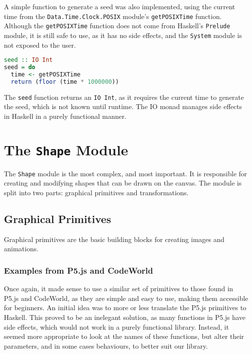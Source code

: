 \documentclass[../main.tex]{subfiles}
\begin{document}
            A simple function to generate a seed was also implemented, using the current
                time from the \texttt{Data.Time.Clock.POSIX} module's \texttt{getPOSIXTime}
                function.
            Although the \texttt{getPOSIXTime} function does not come from Haskell's
                \texttt{Prelude} module, it is still safe to use, as it has no side effects,
                and the \texttt{System} module is not exposed to the user.

            \begin{lstlisting}[language={Haskell}, label={lst:seed}, caption={The \texttt{seed} 
                function.}]
seed :: IO Int
seed = do
  time <- getPOSIXTime
  return (floor (time * 1000000))\end{lstlisting}

            The \texttt{seed} function returns an \texttt{IO Int}, as it requires the
                current time to generate the seed, which is not known until runtime.
            The IO monad manages side effects in Haskell in a purely functional manner.

    \section{The \texttt{Shape}
        Module} The \texttt{Shape} module is the most complex, and most important.
        It is responsible for creating and modifying shapes that can be drawn on the
            canvas.
        The module is split into two parts: graphical primitives and transformations.

        \subsection{Graphical Primitives}
            Graphical primitives are the basic building blocks for creating images and
                animations.

            \subsubsection{Examples from P5.js and CodeWorld}
                Once again, it made sense to use a similar set of primitives to those found in
                    P5.js and CodeWorld, as they are simple and easy to use, making them accessible
                    for beginners.
                An initial idea was to more or less translate the P5.js primitives to Haskell.
                This proved to be an inelegant solution, as many functions in P5.js have side
                    effects, which would not work in a purely functional library.
                Instead, it seemed more appropriate to look at the names of these functions,
                    but alter their parameters, and in some cases behaviours, to better suit our
                    library.
\end{document}
